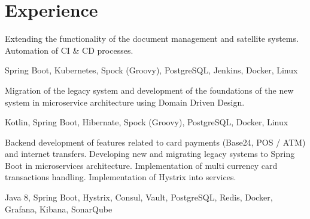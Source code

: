 \documentclass[]{deedy-resume-openfont}
\begin{document}
\begin{minipage}[t]{0.66\textwidth} 


\section{Experience}

Extending the functionality of the document management and satellite systems. Automation of CI \& CD processes.

 Spring Boot, Kubernetes, Spock (Groovy), PostgreSQL, Jenkins, Docker, Linux
\sectionsep

Migration of the legacy system and development of the foundations of the new system in microservice architecture using Domain Driven Design.

 Kotlin, Spring Boot, Hibernate, Spock (Groovy), PostgreSQL, Docker, Linux
\sectionsep

Backend development of features related to card payments (Base24, POS / ATM) and internet transfers. 
Developing new and migrating legacy systems to Spring Boot in microservices architecture.
Implementation of multi currency card transactions handling. 
Implementation of Hystrix into services.

 Java 8, Spring Boot, Hystrix, Consul, Vault, PostgreSQL, Redis, Docker, Grafana, Kibana, SonarQube
\sectionsep


\end{minipage}
\end{document}
